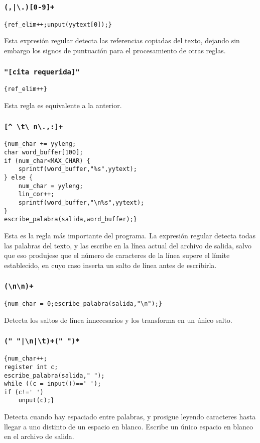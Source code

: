 \documentclass[12pt,titlepage,a4paper]{article}
\theoremstyle{definicion}
\theoremstyle{lema}
\theoremstyle{teorema}
\theoremstyle{corolario}
\theoremstyle{ejemplo}
\theoremstyle{nota}
\begin{document}
\subsubsection*{\texttt{(,|\textbackslash.)[0-9]+}}
\begin{lstlisting}
{ref_elim++;unput(yytext[0]);}
\end{lstlisting}
Esta expresión regular detecta las referencias copiadas del texto, dejando
sin embargo los signos de puntuación para el procesamiento de otras reglas.

\subsubsection*{\texttt{"[cita requerida]"}}
\begin{lstlisting}
{ref_elim++}
\end{lstlisting}
Esta regla es equivalente a la anterior.
\newpage
\subsubsection*{\texttt{[\textasciicircum\; \textbackslash t\textbackslash 
n\textbackslash.,:]+}}
\begin{lstlisting}
{num_char += yyleng;
char word_buffer[100];
if (num_char<MAX_CHAR) { 
	sprintf(word_buffer,"%s",yytext);
} else { 
	num_char = yyleng;
	lin_cor++;
	sprintf(word_buffer,"\n%s",yytext);
}
escribe_palabra(salida,word_buffer);}
\end{lstlisting}
Esta es la regla más importante del programa. La expresión regular detecta 
todas las palabras del texto, y las escribe en la línea actual del archivo de 
salida, salvo que eso produjese que el número de caracteres de la línea supere 
el límite establecido, en cuyo caso inserta un salto de línea antes de
escribirla.

\subsubsection*{\texttt{(\textbackslash n\textbackslash n)+}}
\begin{lstlisting}
{num_char = 0;escribe_palabra(salida,"\n");}
\end{lstlisting}
Detecta los saltos de línea innecesarios y los transforma en un único salto.

\subsubsection*{\texttt{(" "|\textbackslash n|\textbackslash t)+(" ")*}}
\begin{lstlisting}
{num_char++;
register int c;
escribe_palabra(salida," ");
while ((c = input())==' ');
if (c!=' ')
    unput(c);}
\end{lstlisting}
Detecta cuando hay espaciado entre palabras, y prosigue leyendo caracteres
hasta llegar a uno distinto de un espacio en blanco. Escribe un único espacio
en blanco en el archivo de salida.
\end{document}

